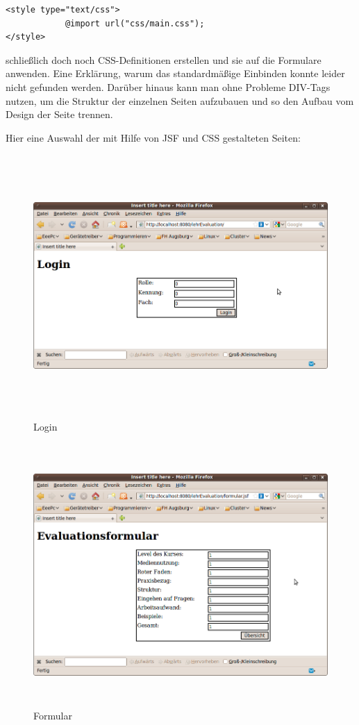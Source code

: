 \documentclass[titlepage, 12pt,a4paper]{scrartcl}
\begin{document}
\begin{lstlisting}
<style type="text/css">
			@import url("css/main.css");
</style>
\end{lstlisting}

schließlich doch noch CSS-Definitionen erstellen und sie auf die Formulare
anwenden. Eine Erklärung, warum das standardmäßige Einbinden konnte leider
nicht gefunden werden.
Darüber hinaus kann man ohne Probleme DIV-Tags nutzen, um die Struktur der
einzelnen Seiten aufzubauen und so den Aufbau vom Design der Seite trennen. 

Hier eine Auswahl der mit Hilfe von JSF und CSS gestalteten Seiten:

\begin{figure}[h]
\begin{center}
\includegraphics[width=15cm, height=10cm]{bilder/loginSeite.png}
\caption{Login}
\label{login}
\end{center}
\end{figure}

\begin{figure}[h]
\begin{center}
\includegraphics[width=15cm, height=10cm]{bilder/formular.png}
\caption{Formular}
\label{formular}
\end{center}
\end{figure}
\end{document}
